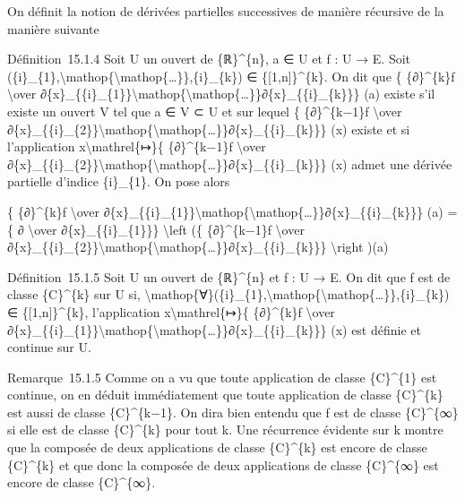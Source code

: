 \documentclass[]{article}
\begin{document}
On définit la notion de dérivées partielles successives de manière
récursive de la manière suivante

Définition~15.1.4 Soit U un ouvert de \{ℝ\}\^{}\{n\}, a ∈ U et f : U →
E. Soit
(\{i\}\_\{1\},\textbackslash{}mathop\{\textbackslash{}mathop\{\ldots{}\}\},\{i\}\_\{k\})
∈ \{{[}1,n{]}\}\^{}\{k\}. On dit que \{ \{∂\}\^{}\{k\}f
\textbackslash{}over
∂\{x\}\_\{\{i\}\_\{1\}\}\textbackslash{}mathop\{\textbackslash{}mathop\{\ldots{}\}\}∂\{x\}\_\{\{i\}\_\{k\}\}\}
(a) existe s'il existe un ouvert V tel que a ∈ V ⊂ U et sur lequel \{
\{∂\}\^{}\{k−1\}f \textbackslash{}over
∂\{x\}\_\{\{i\}\_\{2\}\}\textbackslash{}mathop\{\textbackslash{}mathop\{\ldots{}\}\}∂\{x\}\_\{\{i\}\_\{k\}\}\}
(x) existe et si l'application x\textbackslash{}mathrel\{↦\}\{
\{∂\}\^{}\{k−1\}f \textbackslash{}over
∂\{x\}\_\{\{i\}\_\{2\}\}\textbackslash{}mathop\{\textbackslash{}mathop\{\ldots{}\}\}∂\{x\}\_\{\{i\}\_\{k\}\}\}
(x) admet une dérivée partielle d'indice \{i\}\_\{1\}. On pose alors

\{ \{∂\}\^{}\{k\}f \textbackslash{}over
∂\{x\}\_\{\{i\}\_\{1\}\}\textbackslash{}mathop\{\textbackslash{}mathop\{\ldots{}\}\}∂\{x\}\_\{\{i\}\_\{k\}\}\}
(a) =\{ ∂ \textbackslash{}over ∂\{x\}\_\{\{i\}\_\{1\}\}\}
\textbackslash{}left (\{ \{∂\}\^{}\{k−1\}f \textbackslash{}over
∂\{x\}\_\{\{i\}\_\{2\}\}\textbackslash{}mathop\{\textbackslash{}mathop\{\ldots{}\}\}∂\{x\}\_\{\{i\}\_\{k\}\}\}
\textbackslash{}right )(a)

Définition~15.1.5 Soit U un ouvert de \{ℝ\}\^{}\{n\} et f : U → E. On
dit que f est de classe \{C\}\^{}\{k\} sur U si,
\textbackslash{}mathop\{∀\}(\{i\}\_\{1\},\textbackslash{}mathop\{\textbackslash{}mathop\{\ldots{}\}\},\{i\}\_\{k\})
∈ \{{[}1,n{]}\}\^{}\{k\}, l'application x\textbackslash{}mathrel\{↦\}\{
\{∂\}\^{}\{k\}f \textbackslash{}over
∂\{x\}\_\{\{i\}\_\{1\}\}\textbackslash{}mathop\{\textbackslash{}mathop\{\ldots{}\}\}∂\{x\}\_\{\{i\}\_\{k\}\}\}
(x) est définie et continue sur U.

Remarque~15.1.5 Comme on a vu que toute application de classe
\{C\}\^{}\{1\} est continue, on en déduit immédiatement que toute
application de classe \{C\}\^{}\{k\} est aussi de classe
\{C\}\^{}\{k−1\}. On dira bien entendu que f est de classe
\{C\}\^{}\{∞\} si elle est de classe \{C\}\^{}\{k\} pour tout k. Une
récurrence évidente sur k montre que la composée de deux applications de
classe \{C\}\^{}\{k\} est encore de classe \{C\}\^{}\{k\} et que donc la
composée de deux applications de classe \{C\}\^{}\{∞\} est encore de
classe \{C\}\^{}\{∞\}.
\end{document}
